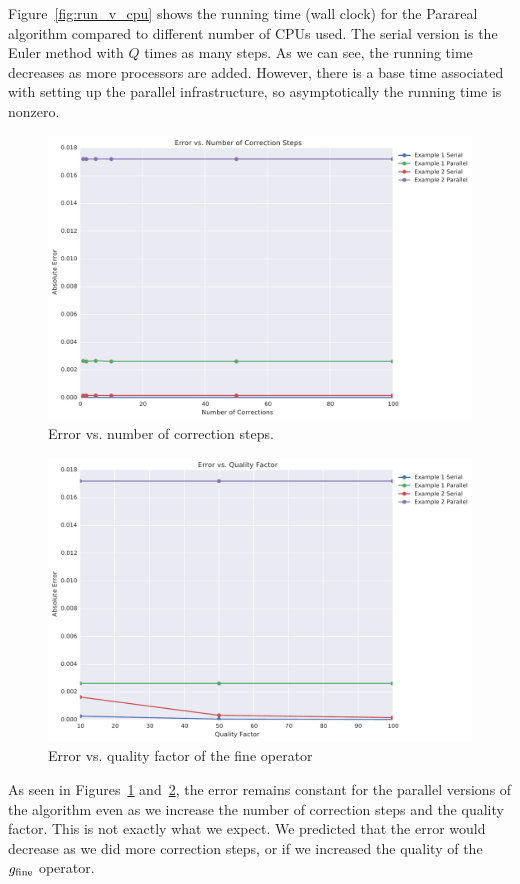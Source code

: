 \documentclass[letterpaper,12pt]{article}
\begin{document}
Figure~\ref{fig:run_v_cpu} shows the running time (wall clock) for the Parareal
algorithm compared to different number of CPUs used. The serial version is the
Euler method with $Q$ times as many steps. As we can see, the running time
decreases as more processors are added. However, there is a base time associated
with setting up the parallel infrastructure, so asymptotically the running time
is nonzero. 

\begin{figure}[H]
\begin{center}
\includegraphics[width=0.75\linewidth]{data/error_vs_corrections.pdf}
\caption{Error vs. number of correction steps.}
\label{fig:err_v_k}
\end{center}
\end{figure}

\begin{figure}[H]
\begin{center}
\includegraphics[width=0.75\linewidth]{data/error_vs_qualityfactor.pdf}
\caption{Error vs. quality factor of the fine operator}
\label{fig:err_v_q}
\end{center}
\end{figure}

As seen in Figures~\ref{fig:err_v_k} and~\ref{fig:err_v_q}, the error remains
constant for the parallel versions of the algorithm even as we increase the
number of correction steps and the quality factor. This is not exactly what we
expect. We predicted that the error would decrease as we did more correction
steps, or if we increased the quality of the $g_{\textnormal{fine}}$ operator. 
\end{document}
